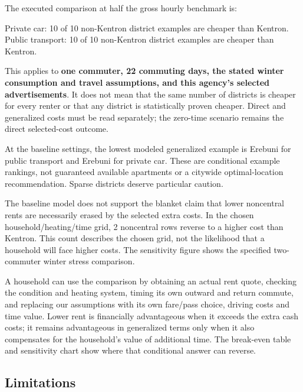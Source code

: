 \documentclass[
]{article}
\begin{document}
The executed comparison at half the gross hourly benchmark is:

Private car: 10 of 10 non-Kentron district examples are cheaper than
Kentron. Public transport: 10 of 10 non-Kentron district examples are
cheaper than Kentron.

This applies to \textbf{one commuter, 22 commuting days, the stated
winter consumption and travel assumptions, and this agency's selected
advertisements}. It does not mean that the same number of districts is
cheaper for every renter or that any district is statistically proven
cheaper. Direct and generalized costs must be read separately; the
zero-time scenario remains the direct selected-cost outcome.

At the baseline settings, the lowest modeled generalized example is
Erebuni for public transport and Erebuni for private car. These are
conditional example rankings, not guaranteed available apartments or a
citywide optimal-location recommendation. Sparse districts deserve
particular caution.

The baseline model does not support the blanket claim that lower
noncentral rents are necessarily erased by the selected extra costs. In
the chosen household/heating/time grid, 2 noncentral rows reverse to a
higher cost than Kentron. This count describes the chosen grid, not the
likelihood that a household will face higher costs. The sensitivity
figure shows the specified two-commuter winter stress comparison.

A household can use the comparison by obtaining an actual rent quote,
checking the condition and heating system, timing its own outward and
return commute, and replacing our assumptions with its own fare/pass
choice, driving costs and time value. Lower rent is financially
advantageous when it exceeds the extra cash costs; it remains
advantageous in generalized terms only when it also compensates for the
household's value of additional time. The break-even table and
sensitivity chart show where that conditional answer can reverse.

\subsection{Limitations}\label{limitations}
\end{document}
